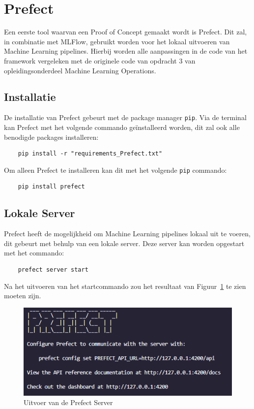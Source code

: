 
\section{Prefect}

Een eerste tool waarvan een Proof of Concept gemaakt wordt is Prefect. Dit zal, in combinatie met MLFlow, gebruikt worden voor het lokaal uitvoeren van Machine Learning pipelines. Hierbij worden alle aanpassingen in de code van het framework vergeleken met de originele code van opdracht 3 van opleidingsonderdeel Machine Learning Operations.

\subsection{Installatie}

De installatie van Prefect gebeurt met de package manager \texttt{pip}. Via de terminal kan Prefect met het volgende commando geïnstalleerd worden, dit zal ook alle benodigde packages installeren:


\begin{verbatim}
    pip install -r "requirements_Prefect.txt"
\end{verbatim}

Om alleen Prefect te installeren kan dit met het volgende \texttt{pip} commando:

\begin{verbatim}
    pip install prefect
\end{verbatim}

\subsection{Lokale Server}

Prefect heeft de mogelijkheid om Machine Learning pipelines lokaal uit te voeren, dit gebeurt met behulp van een lokale server. Deze server kan worden opgestart met het commando:

\begin{verbatim}
    prefect server start
\end{verbatim}

Na het uitvoeren van het startcommando zou het resultaat van Figuur~\ref{fig:Prefect_server} te zien moeten zijn.
\begin{figure}
    \centering
    \includegraphics[width=0.9\linewidth]{graphics/Prefect_server.PNG}
    \caption{Uitvoer van de Prefect Server}
    \label{fig:Prefect_server}
\end{figure}

